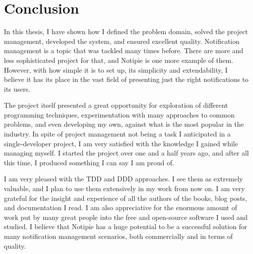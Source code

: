 \section{Conclusion}\label{sec:conclusion}

In this thesis,
I have shown how I defined the problem domain,
solved the project management,
developed the system,
and ensured excellent quality.
Notification management is a topic
that was tackled many times before.
There are more and less sophisticated
project for that,
and Notipie is one more example of them.
However,
with how simple it is to set up,
its simplicity and extendability,
I believe it has its place
in the vast field of
presenting just the right notifications
to its users.

The project itself presented a great opportunity
for exploration of different programming techniques,
experimentation with many approaches to common problems,
and even developing my own,
against what is the most popular in the industry.
In spite of project management
not being a task I anticipated
in a single-developer project,
I am very satisfied with the knowledge
I gained while managing myself.
I started the project over one and a half years ago,
and after all this time, I produced something
I can say I am proud of.

I am very pleased with the \ac{TDD} and \ac{DDD} approaches.
I see them as extremely valuable,
and I plan to use them extensively
in my work from now on.
I am very grateful for the insight
and experience of all the authors of the books,
blog posts, and documentation I read.
I am also appreciative for the enormous amount of work
put by many great people into
the free and open-source software
I used and studied.
I believe that Notipie has a huge potential
to be a successful solution for many
notification management scenarios,
both commercially
and in terms of quality.
